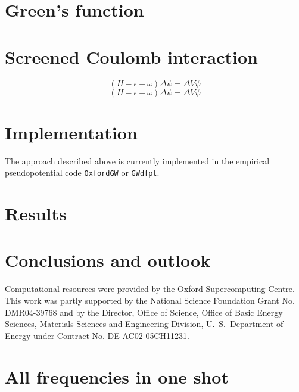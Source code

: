 \documentclass[twocolumn,prb,showpacs,superscriptaddress]{revtex4}
\def\w{\omega}
\begin{document}
\section{Green's function}

\section{Screened Coulomb interaction}

\begin{equation}\label{eq.linsys.1}
(H - \epsilon -\w) \Delta\psi = \Delta V \psi
\end{equation}
\begin{equation}\label{eq.linsys.2}
(H - \epsilon +\w) \Delta\psi = \Delta V \psi
\end{equation}

\section{Implementation}

The approach described above is currently implemented in the empirical
pseudopotential code {\tt OxfordGW} or {\tt GWdfpt}. 

\section{Results}

\section{Conclusions and outlook}

\begin{acknowledgments}
Computational resources were provided by the Oxford Supercomputing Centre.
This work was partly supported by the National Science Foundation Grant No. DMR04-39768 and by
the Director, Office of Science, Office of Basic Energy Sciences, Materials Sciences
and Engineering Division, U.\ S.\ Department of Energy under Contract No. DE-AC02-05CH11231.
\end{acknowledgments}

\appendix

\section{All frequencies in one shot}
\end{document}
